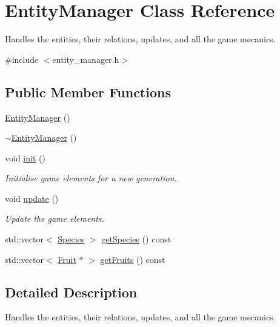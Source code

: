 \hypertarget{class_entity_manager}{\section{Entity\-Manager Class Reference}
\label{class_entity_manager}
}


Handles the entities, their relations, updates, and all the game mecanics.  




{\ttfamily \#include $<$entity\-\_\-manager.\-h$>$}

\subsection*{Public Member Functions}
\begin{DoxyCompactItemize}
\item 
\hyperlink{class_entity_manager_a7555637657d090171be6ceee8451de0a}{Entity\-Manager} ()
\item 
\hyperlink{class_entity_manager_a71a36c9fb8d579a1a1ec108e0fccf175}{$\sim$\-Entity\-Manager} ()
\item 
void \hyperlink{class_entity_manager_ae0abecb1a8037d6af51d950491115bfb}{init} ()
\begin{DoxyCompactList}\small\item\em Initialise game elements for a new generation. \end{DoxyCompactList}\item 
void \hyperlink{class_entity_manager_abc6a2cc5077501f4b06d88f4ed3e7e31}{update} ()
\begin{DoxyCompactList}\small\item\em Update the game elements. \end{DoxyCompactList}\item 
std\-::vector$<$ \hyperlink{struct_species}{Species} $>$ \hyperlink{class_entity_manager_ac6f76079b0963ac7386a79b6bd346bd8}{get\-Species} () const 
\item 
std\-::vector$<$ \hyperlink{class_fruit}{Fruit} $\ast$ $>$ \hyperlink{class_entity_manager_aa54e413de0914b0f7e048627b7dc07f4}{get\-Fruits} () const 
\end{DoxyCompactItemize}


\subsection{Detailed Description}
Handles the entities, their relations, updates, and all the game mecanics. 

